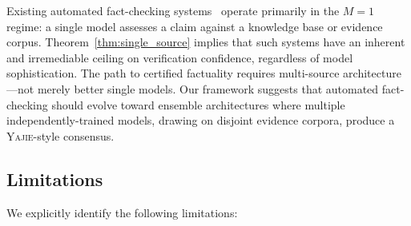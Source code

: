 \documentclass[11pt,a4paper]{article}
\theoremstyle{definition}
\newcommand{\Yajie}{\textsc{Yajie}}
\begin{document}
Existing automated fact-checking systems~\cite{guo2022, zeng2023} operate primarily in the $M = 1$ regime: a single model assesses a claim against a knowledge base or evidence corpus. Theorem~\ref{thm:single_source} implies that such systems have an inherent and irremediable ceiling on verification confidence, regardless of model sophistication. The path to certified factuality requires multi-source architecture---not merely better single models. Our framework suggests that automated fact-checking should evolve toward ensemble architectures where multiple independently-trained models, drawing on disjoint evidence corpora, produce a \Yajie{}-style consensus.

\subsection{Limitations }

We explicitly identify the following limitations:
\end{document}
